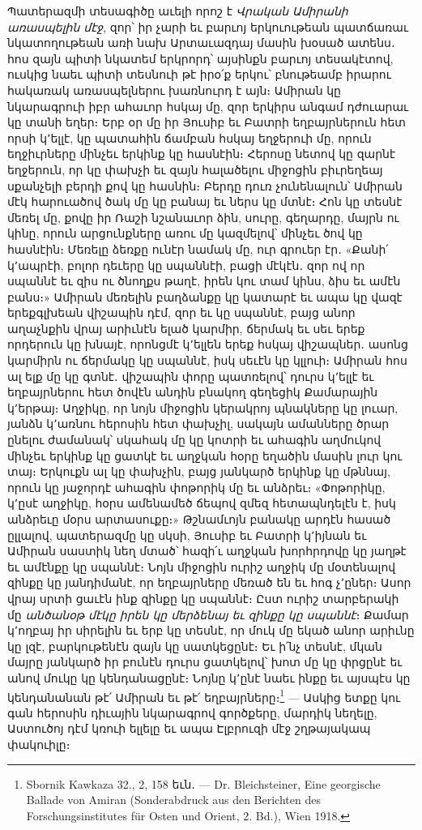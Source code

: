 \documentclass{article}
\begin{document}
{Պատերազմի տեսագիծը աւելի որոշ է \emph{Վրական Ամիրանի առասպելին մէջ}, զոր՝ իր չարի եւ բարւոյ երկուութեան պատճառաւ նկատողութեան առի նախ Արտաւազդայ մասին խօսած ատենս․ հոս զայն պիտի նկատեմ երկրորդ՝ այսինքն բարւոյ տեսակէտով, ուսկից նաեւ պիտի տեսնուի թէ իրօ՛ք երկու՝ բնութեամբ իրարու հակառակ առասպելներու խառնուրդ է այն։ Ամիրան կը նկարագրուի իբր ահաւոր հսկայ մը, զոր երկիրս անգամ դժուարաւ կը տանի եղեր։ Երբ օր մը իր Յուսիբ եւ Բատրի եղբայրներուն հետ որսի կ՚ելլէ, կը պատահին ճամբան հսկայ եղջերուի մը, որուն եղջիւրները մինչեւ երկինք կը հասնէին։ Հերոսը նետով կը զարնէ եղջերուն, որ կը փախչի եւ զայն հալածելու միջոցին բիւրեղեայ սքանչելի բերդի քով կը հասնին։ Բերդը դուռ չունենալուն՝ Ամիրան մէկ հարուածով ծակ մը կը բանայ եւ ներս կը մտնէ։ Հոն կը տեսնէ մեռել մը, քովը իր Ռաշի նշանաւոր ձին, սուրը, գեղարդը, մայրն ու կինը, որուն արցունքները առու մը կազմելով՝ մինչեւ ծով կը հասնէին։ Մեռելը ձեռքը ունէր նամակ մը, ուր գրուեր էր․ «Քանի՛ կ՚ապրէի, բոլոր դեւերը կը սպաննէի, բացի մէկէն․ զոր ով որ սպաննէ եւ զիս ու ծնողքս թաղէ, իրեն կու տամ կինս, ձիս եւ ամէն բանս։» Ամիրան մեռելին բաղձանքը կը կատարէ եւ ապա կը վազէ երեքգլխեան վիշապին դէմ, զոր եւ կը սպաննէ, բայց անոր աղաչնքին վրայ արիւնէն ելած կարմիր, ճերմակ եւ սեւ երեք որդերուն կը խնայէ, որոնցմէ կ՚ելլեն երեք հսկայ վիշապներ․ ասոնց կարմիրն ու ճերմակը կը սպաննէ, իսկ սեւէն կը կլլուի։ Ամիրան հոս ալ ելք մը կը գտնէ․ վիշապին փորը պատռելով՝ դուրս կ՚ելլէ եւ եղբայրներու հետ ծովէն անդին բնակող գեղեցիկ Քամարային կ՚երթայ։ Աղջիկը, որ նոյն միջոցին կերակրոյ պնակները կը լուար, յանձն կ՚առնու հերոսին հետ փախչիլ, սակայն ամանները ծրար ընելու ժամանակ՝ սկահակ մը կը կոտրի եւ ահագին աղմուկով մինչեւ երկինք կը ցատկէ եւ աղջկան հօրը եղածին մասին լուր կու տայ։ Երկուքն ալ կը փախչին, բայց յանկարծ երկինք կը մթննայ, որուն կը յաջորդէ ահագին փոթորիկ մը եւ անձրեւ։ «Փոթորիկը, կ՚ըսէ աղջիկը, հօրս ամենամեծ ճեպով զմեզ հետապնդելէն է, իսկ անձրեւը մօրս արտասուքը։» Թշնամւոյն բանակը արդէն հասած ըլլալով, պատերազմը կը սկսի, Յուսիբ եւ Բատրի կ՚իյնան եւ Ամիրան սաստիկ նեղ մտած՝ հազի՛ւ աղջկան խորհրդովը կը յաղթէ եւ ամէնքը կը սպաննէ։ Նոյն միջոցին ուրիշ աղջիկ մը մօտենալով զինքը կը յանդիմանէ, որ եղբայրները մեռած են եւ հոգ չ՚ըներ։ Ասոր վրայ սրտի ցաւէն ինք զինքը կը սպաննէ։ Ըստ ուրիշ տարբերակի մը \emph{անծանօթ մէկը իրեն կը մերձենայ եւ զինքը կը սպաննէ}։ Քամար կ՚ողբայ իր սիրելին եւ երբ կը տեսնէ, որ մուկ մը եկած անոր արիւնը կը լզէ, բարկութենէն զայն կը սատկեցընէ։ Եւ ի՛նչ տեսնէ, մկան մայրը յանկարծ իր բունէն դուրս ցատկելով՝ խոտ մը կը փրցընէ եւ անով մուկը կը կենդանացընէ։ Նոյնը կ՚ընէ նաեւ ինքը եւ այսպէս կը կենդանանան թէ՛ Ամիրան եւ թէ՛ եղբայրները։\footnote{Sbornik Kawkaza 32., 2, 158 եւն․ — Dr. Bleichsteiner, Eine georgische Ballade von Amiran (Sonderabdruck aus den Berichten des Forschungsinstitutes für Osten und Orient, 2. Bd.), Wien 1918.} — Ասկից ետքը կու գան հերոսին դիւային նկարագրով գործքերը, մարդիկ նեղելը, Աստուծոյ դէմ կռուի ելլելը եւ ապա Էլբրուզի մէջ շղթայակապ փակուիլը։

}
\end{document}
